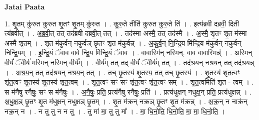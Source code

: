 \documentclass[17pt]{extarticle}
\begin{document}
\textbf{Jatai Paata} \newline

1. शृ॒तम् कु॑रुत कुरुत शृ॒तꣳ शृ॒तम् कु॑रुत । . कु॒रु॒ते तीति॑ कुरुत कुरु॒ते ति॑ । . इत्य॑ब्रवी दब्रवी॒ दिती त्य॑ब्रवीत् । . अ॒ब्र॒वी॒त् तत् तद॑ब्रवी दब्रवी॒त् तत् । . तद॑स्मा अस्मै॒ तत् तद॑स्मै । . अ॒स्मै॒ शृ॒तꣳ शृ॒त म॑स्मा अस्मै शृ॒तम् । . शृ॒त म॑कुर्वन् नकुर्वञ् छृ॒तꣳ शृ॒त म॑कुर्वन्न् । . अ॒कु॒र्व॒न् नि॒न्द्रि॒य मि॑न्द्रि॒य म॑कुर्वन् नकुर्वन् निन्द्रि॒यम् । . इ॒न्द्रि॒यं ॅवाव वावे न्द्रि॒य मि॑न्द्रि॒यं ॅवाव । . वावास्मि॑न् नस्मि॒न्॒. वाव वावास्मिन्न्॑ । . अ॒स्मि॒न् वी॒र्यं॑ ॅवी॒र्य॑ मस्मिन् नस्मिन् वी॒र्य᳚म् । . वी॒र्य॑म् तत् तद् वी॒र्यं॑ ॅवी॒र्य॑म् तत् । . तद॑श्रयन् नश्रय॒न् तत् तद॑श्रयन्न् । . अ॒श्र॒य॒न् तत् तद॑श्रयन् नश्रय॒न् तत् । . तच् छृ॒तस्य॑ शृ॒तस्य॒ तत् तच् छृ॒तस्य॑ । . शृ॒तस्य॑ शृत॒त्वꣳ शृ॑त॒त्वꣳ शृ॒तस्य॑ शृ॒तस्य॑ शृत॒त्वम् । . शृ॒त॒त्वꣳ सꣳ सꣳ शृ॑त॒त्वꣳ शृ॑त॒त्वꣳ सम् । . शृ॒त॒त्वमिति॑ शृत - त्वम् । . स म॑नैषु रनैषुः॒ सꣳ स म॑नैषुः । . अ॒नै॒षुः॒ प्रति॒ प्रत्य॑नैषु रनैषुः॒ प्रति॑ । . प्रत्य॑धुक्षन् नधुक्ष॒न् प्रति॒ प्रत्य॑धुक्षन्न् । . अ॒धु॒क्ष॒ञ् छृ॒तꣳ शृ॒त म॑धुक्षन् नधुक्षञ् छृ॒तम् । . शृ॒त म॑क्रन् नक्रञ् छृ॒तꣳ शृ॒त म॑क्रन्न् । . अ॒क्र॒न् न नाक्र॑न् नक्र॒न् न । . न तु तु न न तु । . तु मा॑ मा॒ तु तु मा᳚ । . मा॒ धि॒नो॒ति॒ धि॒नो॒ति॒ मा॒ मा॒ धि॒नो॒ति॒ । \newline
\end{document}

